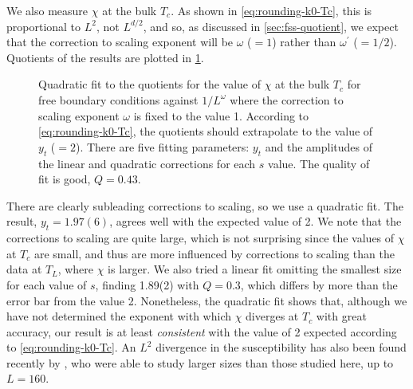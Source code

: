 We also measure $\chi$ at the bulk $T_c$. As shown in \cref{eq:rounding-k0-Tc},
this is proportional to $L^2$, not $L^{d/2}$, and so, as discussed in
\cref{sec:fss-quotient}, we expect that the correction to scaling exponent will
be $\omega$ ($=1$) rather than $\omega^{\prime}$ ($=1/2$). Quotients of the
results are plotted in
\cref{fig:qchiTc}.
\begin{figure}
  \centering
  
  \caption[
    Quotient estimation of the width exponent $y_t$ for $\vec{k}\neq\vec{0}$
    modes of the five-dimensional Ising model with free boundary conditions.
  ]
  {
    Quadratic fit to the quotients for the value of $\chi$ at the bulk $T_c$
    for free boundary conditions against $1/L^{\omega}$ where the correction
    to scaling exponent $\omega$ is fixed to the value 1.
    According to \cref{eq:rounding-k0-Tc}, the quotients should extrapolate
    to the value of $y_t$ ($=2$). There are five fitting parameters:
    $y_t$ and the amplitudes of the linear and quadratic corrections for
    each $s$ value. The quality of fit is good, $Q=0.43$.
  }
  \label{fig:qchiTc}
\end{figure}
There are clearly subleading corrections to scaling, so we use a quadratic fit.
The result, $y_t=1.97(6)$,
agrees well with the expected value of 2. We note that the corrections to
scaling are quite large, which is not surprising since the values of $\chi$ at
$T_c$ are small, and thus are more influenced by corrections to scaling than
the data at $T_L$, where $\chi$ is larger.
We also tried a linear fit omitting the smallest size for each value of $s$,
finding 1.89(2) with $Q=0.3$, which differs by more than the error bar from the
value 2. Nonetheless, the quadratic fit shows that, although we have not
determined the exponent with which $\chi$ diverges at $T_c$ with great
accuracy, our result is at least \emph{consistent} with the value of 2 expected
according to \cref{eq:rounding-k0-Tc}. An $L^2$ divergence in the
susceptibility has also been found recently by \textcite{lundow2014finite}, who
were able to study larger sizes than those studied here, up to $L=160$.

